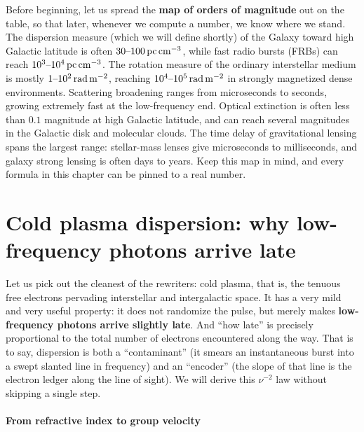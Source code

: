 Before beginning, let us spread the \textbf{map of orders of magnitude} out on the table, so that later, whenever we compute a number, we know where we stand. The dispersion measure (which we will define shortly) of the Galaxy toward high Galactic latitude is often \(30\text{--}100\,{\rm pc\,cm^{-3}}\), while fast radio bursts (FRBs) can reach \(10^{3}\text{--}10^{4}\,{\rm pc\,cm^{-3}}\). The rotation measure of the ordinary interstellar medium is mostly \(1\text{--}10^{2}\,{\rm rad\,m^{-2}}\), reaching \(10^{4}\text{--}10^{5}\,{\rm rad\,m^{-2}}\) in strongly magnetized dense environments. Scattering broadening ranges from microseconds to seconds, growing extremely fast at the low-frequency end. Optical extinction is often less than \(0.1\) magnitude at high Galactic latitude, and can reach several magnitudes in the Galactic disk and molecular clouds. The time delay of gravitational lensing spans the largest range: stellar-mass lenses give microseconds to milliseconds, and galaxy strong lensing is often days to years. Keep this map in mind, and every formula in this chapter can be pinned to a real number.

\section{Cold plasma dispersion: why low-frequency photons arrive late}
\label{sec:e21-dispersion}

Let us pick out the cleanest of the rewriters: cold plasma, that is, the tenuous free electrons pervading interstellar and intergalactic space. It has a very mild and very useful property: it does not randomize the pulse, but merely makes \textbf{low-frequency photons arrive slightly late}. And ``how late'' is precisely proportional to the total number of electrons encountered along the way. That is to say, dispersion is both a ``contaminant'' (it smears an instantaneous burst into a swept slanted line in frequency) and an ``encoder'' (the slope of that line is the electron ledger along the line of sight). We will derive this \(\nu^{-2}\) law without skipping a single step.

\paragraph{From refractive index to group velocity}
\label{sec:e21-groupvel}

